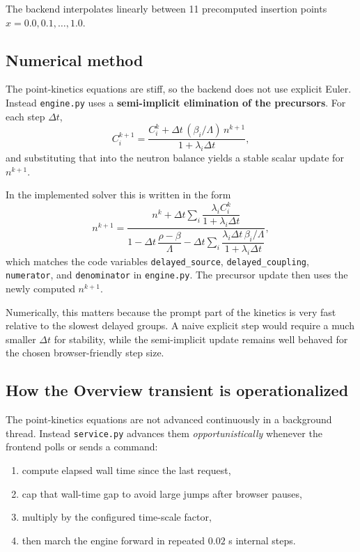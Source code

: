 \documentclass[11pt]{article}
\begin{document}
The backend interpolates linearly between 11 precomputed insertion points
$x = 0.0, 0.1, \dots, 1.0$.

\subsection{Numerical method}

The point-kinetics equations are stiff, so the backend does not use explicit
Euler.  Instead \texttt{engine.py} uses a \textbf{semi-implicit elimination of
the precursors}.  For each step $\Delta t$,
\[
C_i^{k+1}
=
\frac{C_i^k + \Delta t\,(\beta_i/\Lambda)\,n^{k+1}}
{1 + \lambda_i \Delta t},
\]
and substituting that into the neutron balance yields a stable scalar update for
$n^{k+1}$.

In the implemented solver this is written in the form
\[
n^{k+1}
=
\frac{n^k + \Delta t\sum_i \dfrac{\lambda_i C_i^k}{1+\lambda_i\Delta t}}
{1 - \Delta t\,\dfrac{\rho-\beta}{\Lambda}
 - \Delta t\sum_i
   \dfrac{\lambda_i \Delta t\,\beta_i/\Lambda}{1+\lambda_i\Delta t}},
\]
which matches the code variables
\texttt{delayed\_source}, \texttt{delayed\_coupling}, \texttt{numerator}, and
\texttt{denominator} in \texttt{engine.py}.  The precursor update then uses the
newly computed $n^{k+1}$.

Numerically, this matters because the prompt part of the kinetics is very fast
relative to the slowest delayed groups.  A naive explicit step would require a
much smaller $\Delta t$ for stability, while the semi-implicit update remains
well behaved for the chosen browser-friendly step size.

\subsection{How the Overview transient is operationalized}

The point-kinetics equations are not advanced continuously in a background
thread.  Instead \texttt{service.py} advances them \emph{opportunistically}
whenever the frontend polls or sends a command:
\begin{enumerate}
  \item compute elapsed wall time since the last request,
  \item cap that wall-time gap to avoid large jumps after browser pauses,
  \item multiply by the configured time-scale factor,
  \item then march the engine forward in repeated $0.02$ s internal steps.
\end{enumerate}
\end{document}
